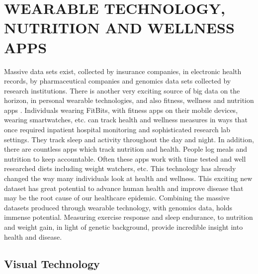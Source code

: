 \documentclass[sigconf]{acmart}
\begin{document}
\section{WEARABLE TECHNOLOGY, NUTRITION AND WELLNESS APPS}

Massive data sets exist, collected by insurance companies, in
electronic health records, by pharmaceutical companies and genomics data sets collected by research
institutions.  There is another very exciting source of big data on
the horizon, in personal wearable technologies, and also fitness,
wellness and nutrition apps \cite{fox6}.  Individuals wearing FitBits, with
fitness apps on their mobile devices, wearing smartwatches, etc. can
track health and wellness measures in ways that once required
inpatient hospital monitoring and sophisticated research lab settings.
They track sleep and activity throughout the day and night.  In
addition, there are countless apps which track nutrition and health.
People log meals and nutrition to keep accountable.  Often these apps
work with time tested and well researched diets including weight
watchers, etc.  This technology has already changed the way many
individuals look at health and wellness.  This exciting new dataset
has great potential to advance human health and improve disease that
may be the root cause of our healthcare epidemic.  Combining the massive datasets produced through wearable technology, with genomics data, holds immense potential.  Measuring exercise response and sleep endurance, to nutrition and weight gain, in light of genetic background, provide incredible insight into health and disease.  

\subsection{Visual Technology}
\end{document}
